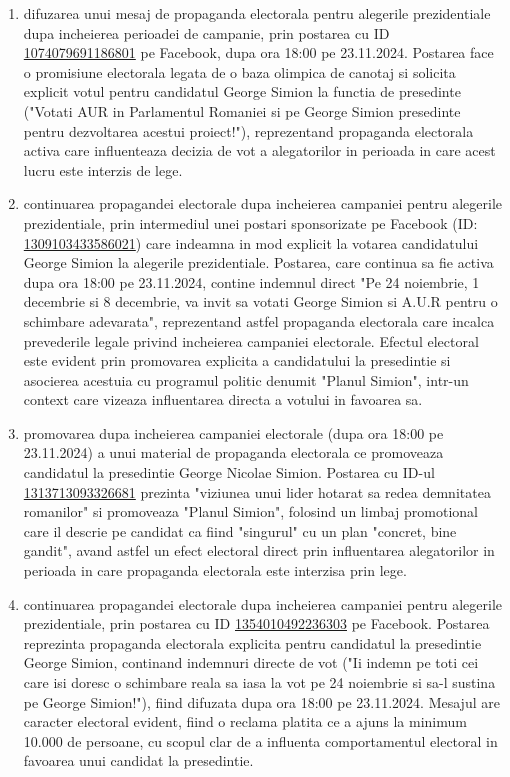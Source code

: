 \documentclass[a4paper,12pt]{article}
\begin{document}
\begin{enumerate}[leftmargin=*, label=\arabic*.)]
    \item difuzarea unui mesaj de propaganda electorala pentru alegerile prezidentiale dupa incheierea perioadei de campanie, prin postarea cu ID \href{https://www.facebook.com/ads/library/?id=1074079691186801}{1074079691186801} pe Facebook, dupa ora 18:00 pe 23.11.2024. Postarea face o promisiune electorala legata de o baza olimpica de canotaj si solicita explicit votul pentru candidatul George Simion la functia de presedinte ("Votati AUR in Parlamentul Romaniei si pe George Simion presedinte pentru dezvoltarea acestui proiect!"), reprezentand propaganda electorala activa care influenteaza decizia de vot a alegatorilor in perioada in care acest lucru este interzis de lege.
    \item continuarea propagandei electorale dupa incheierea campaniei pentru alegerile prezidentiale, prin intermediul unei postari sponsorizate pe Facebook (ID: \href{https://www.facebook.com/ads/library/?id=1309103433586021}{1309103433586021}) care indeamna in mod explicit la votarea candidatului George Simion la alegerile prezidentiale. Postarea, care continua sa fie activa dupa ora 18:00 pe 23.11.2024, contine indemnul direct "Pe 24 noiembrie, 1 decembrie si 8 decembrie, va invit sa votati George Simion si A.U.R pentru o schimbare adevarata", reprezentand astfel propaganda electorala care incalca prevederile legale privind incheierea campaniei electorale. Efectul electoral este evident prin promovarea explicita a candidatului la presedintie si asocierea acestuia cu programul politic denumit "Planul Simion", intr-un context care vizeaza influentarea directa a votului in favoarea sa.
    \item promovarea dupa incheierea campaniei electorale (dupa ora 18:00 pe 23.11.2024) a unui material de propaganda electorala ce promoveaza candidatul la presedintie George Nicolae Simion. Postarea cu ID-ul \href{https://www.facebook.com/ads/library/?id=1313713093326681}{1313713093326681} prezinta "viziunea unui lider hotarat sa redea demnitatea romanilor" si promoveaza "Planul Simion", folosind un limbaj promotional care il descrie pe candidat ca fiind "singurul" cu un plan "concret, bine gandit", avand astfel un efect electoral direct prin influentarea alegatorilor in perioada in care propaganda electorala este interzisa prin lege.
    \item continuarea propagandei electorale dupa incheierea campaniei pentru alegerile prezidentiale, prin postarea cu ID \href{https://www.facebook.com/ads/library/?id=1354010492236303}{1354010492236303} pe Facebook. Postarea reprezinta propaganda electorala explicita pentru candidatul la presedintie George Simion, continand indemnuri directe de vot ("Ii indemn pe toti cei care isi doresc o schimbare reala sa iasa la vot pe 24 noiembrie si sa-l sustina pe George Simion!"), fiind difuzata dupa ora 18:00 pe 23.11.2024. Mesajul are caracter electoral evident, fiind o reclama platita ce a ajuns la minimum 10.000 de persoane, cu scopul clar de a influenta comportamentul electoral in favoarea unui candidat la presedintie.

\end{enumerate}
\end{document}
